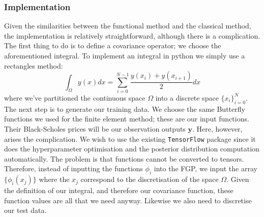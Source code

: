 \documentclass[a4paper,12pt]{article}
\begin{document}
\subsubsection{Implementation}
Given the similarities between the functional method and the classical method, the implementation is relatively straightforward, although there is a complication. The first thing to do is to define a covariance operator; we choose the aforementioned integral. To implement an integral in python we simply use a rectangles method:
\begin{equation}
    \int_\Omega y(x) dx = \sum_{i=0}^{N-1} \frac{y(x_i) + y(x_{i+1})}{2} dx
\end{equation}
where we've partitioned the continuous space $\Omega$ into a discrete space $\{x_i\}_{i=0}^N$.\\
The next step is to generate our training data. We choose the same Butterfly functions we used for the finite element method; these are our input functions. Their Black-Scholes prices will be our observation outputs $\mathbf{y}$. Here, however, arises the complication. We wish to use the existing \texttt{TensorFlow} package since it does the hyperparameter optimisation and the posterior distribution computation automatically. The problem is that functions cannot be converted to tensors. Therefore, instead of inputting the functions $\phi_i$ into the FGP, we input the array $\{\phi_i(x_j)\}$ where the $x_j$ correspond to the discretisation of the space $\Omega$. Given the definition of our integral, and therefore our covariance function, these function values are all that we need anyway. Likewise we also need to discretise our test data.
\end{document}
